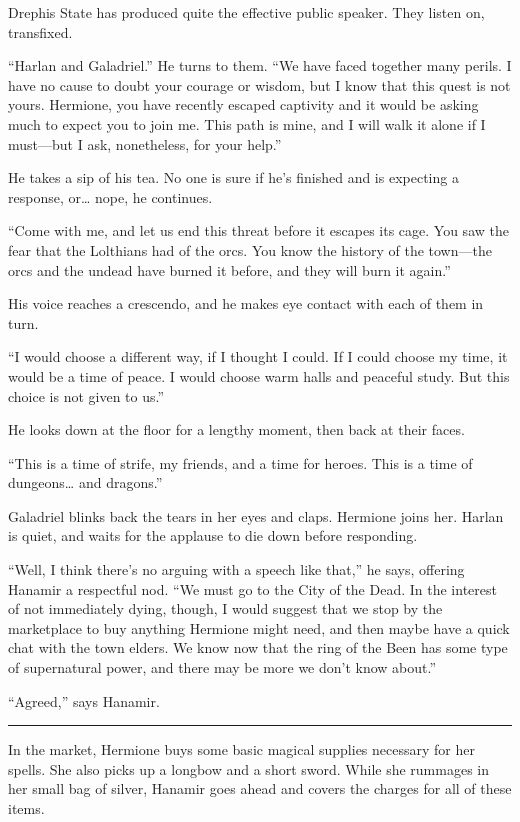\documentclass[smalldemyvopaper,11pt,twoside,onecolumn,openright,extrafontsizes]{memoir}
\begin{document}
Drephis State has produced quite the effective public speaker. They
listen on, transfixed.

``Harlan and Galadriel.'' He turns to them. ``We have faced together
many perils. I have no cause to doubt your courage or wisdom, but I know
that this quest is not yours. Hermione, you have recently escaped
captivity and it would be asking much to expect you to join me. This
path is mine, and I will walk it alone if I must---but I ask,
nonetheless, for your help.''

He takes a sip of his tea. No one is sure if he's finished and is
expecting a response, or\ldots{} nope, he continues.

``Come with me, and let us end this threat before it escapes its cage.
You saw the fear that the Lolthians had of the orcs. You know the
history of the town---the orcs and the undead have burned it before, and
they will burn it again.''

His voice reaches a crescendo, and he makes eye contact with each of
them in turn.

``I would choose a different way, if I thought I could. If I could
choose my time, it would be a time of peace. I would choose warm halls
and peaceful study. But this choice is not given to us.''

He looks down at the floor for a lengthy moment, then back at their
faces.

``This is a time of strife, my friends, and a time for heroes. This is a
time of dungeons\ldots{} and dragons.''

Galadriel blinks back the tears in her eyes and claps. Hermione joins
her. Harlan is quiet, and waits for the applause to die down before
responding.

``Well, I think there's no arguing with a speech like that,'' he says,
offering Hanamir a respectful nod. ``We must go to the City of the Dead.
In the interest of not immediately dying, though, I would suggest that
we stop by the marketplace to buy anything Hermione might need, and then
maybe have a quick chat with the town elders. We know now that the ring
of the Been has some type of supernatural power, and there may be more
we don't know about.''

``Agreed,'' says Hanamir.

\begin{center}\rule{0.5\linewidth}{\linethickness}\end{center}

In the market, Hermione buys some basic magical supplies necessary for
her spells. She also picks up a longbow and a short sword. While she
rummages in her small bag of silver, Hanamir goes ahead and covers the
charges for all of these items.
\end{document}
